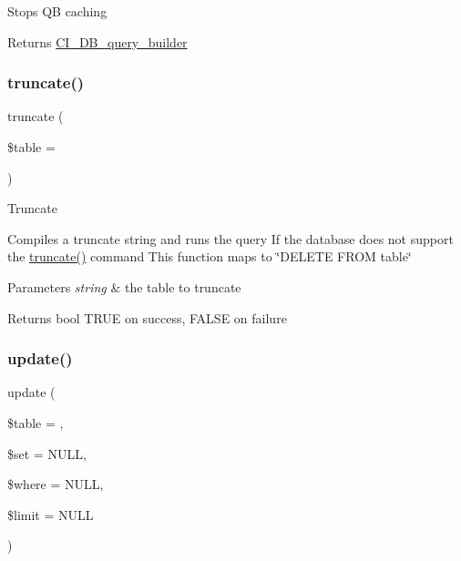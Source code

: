 Stops QB caching

\begin{DoxyReturn}{Returns}
\mbox{\hyperlink{class_c_i___d_b__query__builder}{C\+I\+\_\+\+D\+B\+\_\+query\+\_\+builder}} 
\end{DoxyReturn}
\mbox{\label{class_c_i___d_b__query__builder_acaa636a6a61d4362c5a32941fc9932ba}} 
\subsubsection{\texorpdfstring{truncate()}{truncate()}}
{\footnotesize\ttfamily truncate (\begin{DoxyParamCaption}\item[{}]{\$table = {\ttfamily \textquotesingle{}\textquotesingle{}} }\end{DoxyParamCaption})}

Truncate

Compiles a truncate string and runs the query If the database does not support the \mbox{\hyperlink{class_c_i___d_b__query__builder_acaa636a6a61d4362c5a32941fc9932ba}{truncate()}} command This function maps to \char`\"{}\+D\+E\+L\+E\+T\+E F\+R\+O\+M table\char`\"{}


\begin{DoxyParams}{Parameters}
{\em string} & the table to truncate \\
\hline
\end{DoxyParams}
\begin{DoxyReturn}{Returns}
bool T\+R\+UE on success, F\+A\+L\+SE on failure 
\end{DoxyReturn}
\mbox{\label{class_c_i___d_b__query__builder_a130a26da2dd4e4582ee18f42d71fe6e4}} 
\subsubsection{\texorpdfstring{update()}{update()}}
{\footnotesize\ttfamily update (\begin{DoxyParamCaption}\item[{}]{\$table = {\ttfamily \textquotesingle{}\textquotesingle{}},  }\item[{}]{\$set = {\ttfamily NULL},  }\item[{}]{\$where = {\ttfamily NULL},  }\item[{}]{\$limit = {\ttfamily NULL} }\end{DoxyParamCaption})}

